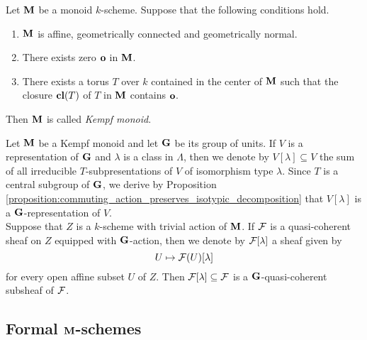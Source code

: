 \begin{definition}
Let $\mathbf{M}$ be a monoid $k$-scheme. Suppose that the following conditions hold.
\begin{enumerate}[label=\textbf{(\arabic*)}, leftmargin=1.5em]
\item $\mathbf{M}$ is affine, geometrically connected and geometrically normal.
\item There exists zero $\mathbf{o}$ in $\mathbf{M}$.
\item There exists a torus $T$ over $k$ contained in the center of $\mathbf{M}$ such that the closure $\mathbf{cl}(T)$ of $T$ in $\mathbf{M}$ contains $\mathbf{o}$.
\end{enumerate}
Then $\mathbf{M}$ is called \textit{Kempf  monoid}.
\end{definition}
\noindent
Let $\mathbf{M}$ be a Kempf monoid and let $\mathbf{G}$ be its group of units. If $V$ is a representation of $\mathbf{G}$ and $\lambda$ is a class in $\Lambda$, then we denote by $V[\lambda]\subseteq V$ the sum of all irreducible $T$-subpresentations of $V$ of isomorphism type $\lambda$. Since $T$ is a central subgroup of $\mathbf{G}$, we derive by Proposition \ref{proposition:commuting_action_preserves_isotypic_decomposition} that $V[\lambda]$ is a $\mathbf{G}$-representation of $V$.\\
Suppose that $Z$ is a $k$-scheme with trivial action of $\mathbf{M}$. If ${\mathcal F}$ is a quasi-coherent sheaf on $Z$ equipped with $\mathbf{G}$-action, then we denote by ${\mathcal F}[\lambda]$ a sheaf given by
$$U\mapsto {\mathcal F}(U)[\lambda]$$
for every open affine subset $U$ of $Z$. Then ${\mathcal F}[\lambda]\subseteq {\mathcal F}$ is a $\mathbf{G}$-quasi-coherent subsheaf of ${\mathcal F}$.

\subsection{Formal $\mathbf{M}$-schemes}

